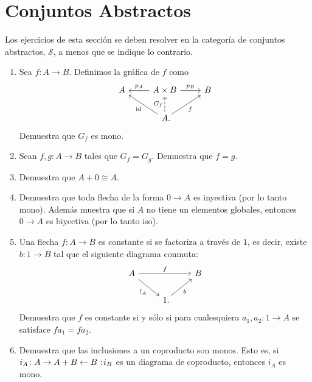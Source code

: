 \documentclass[11pt]{article}
\newcommand{\id}{\mathrm{id}}
\newcommand{\topos}[1]{\mathscr{#1}}
\newcommand{\noloc}{%
  \nobreak
  \mspace{6mu plus 1mu}
  {:}
  \nonscript\mkern-\thinmuskip
  \mathpunct{}
  \mspace{2mu}
}
\begin{document}
   

  \section*{Conjuntos Abstractos}
  Los ejercicios de esta sección se deben resolver en la categoría de conjuntos
  abstractos, \(\topos{S}\), a menos que se indique lo contrario.
  \begin{enumerate}[\bf\text{Ej.} 1.]
    \item Sea \(f\colon A\to B\). Definimos la gráfica de \(f\) como
      \begin{equation*}
        \begin{tikzcd}
          A & A\times B\ar{l}[swap]{p_A}\ar{r}{p_B} & B\\
          & A\mathrlap{.}\ar{ul}{\id}\ar{ur}[swap]{f}\ar[dashed]{u}{G_f}
        \end{tikzcd}
      \end{equation*}
      Demuestra que \(G_f\) es mono.

    \item Sean \(f,g\colon A\to B\) tales que \(G_f=G_g\). Demuestra que \(f=g\).
    
    \item Demuestra que \(A+0\cong A\).
    
    \item Demuestra que toda flecha de la forma \(0\to A\) es inyectiva (por lo
    tanto mono). Además muestra que si \(A\) no tiene un elementos globales, entonces
    \(0\to A\) es biyectiva (por lo tanto iso).
    
    \item Una flecha \(f\colon A\to B\) es constante si se factoriza a través de
    \(1\), es decir, existe \(b\colon 1\to B\) tal que el siguiente diagrama
    conmuta:
    \begin{equation*}
      \begin{tikzcd}
        A\ar{rr}{f}\ar{dr}[swap]{!_A} && B\\
        & 1\mathrlap{.}\ar{ur}[swap]{b}
      \end{tikzcd}
    \end{equation*}
    Demuestra que \(f\) es constante si y sólo si para cualesquiera 
    \(a_1,a_2\colon 1\to A\) se satisface \(fa_1 = fa_2\).

    \item Demuestra que las inclusiones a un coproducto son monos. Esto es, si 
    \(i_A\colon A\to A+B\leftarrow B\noloc i_B\) es un diagrama de coproducto,
    entonces \(i_A\) es mono.


\end{enumerate}
\end{document}
